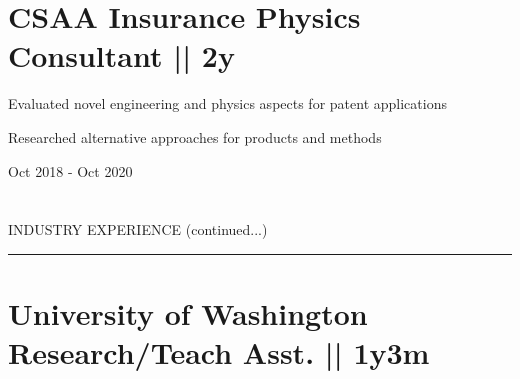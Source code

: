 
\section
{\textbf{CSAA Insurance} \newline
Physics Consultant || 2y}{}

\begin{detail}
\vspace{-2.5ex}
\BulletItem
Evaluated novel engineering and physics aspects for patent applications

\BulletItem
Researched alternative approaches for products and methods
\end{detail}

\begin{subtitle}
\vspace{-7.8ex}
{{Oct 2018 - Oct 2020}} 
\end{subtitle}

\begin{subtitle}
\vspace{-2.0ex}
\end{subtitle}
\vspace{2ex}


\section{}{}

{\hspace{-1.72in}\noindent\color{cblue} INDUSTRY EXPERIENCE (continued...)}
\vspace{5ex}

\vspace{-6.5ex}
{\hspace{-1.73in}\noindent\color{dblue}\rule{6.935in}{0.4pt}} %
\vspace{-0.4ex}


\section
{\textbf{University of Washington} \newline
Research/Teach Asst. || 1y3m}{}

